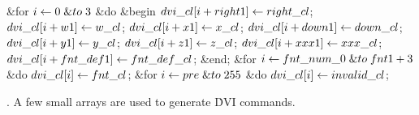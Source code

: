 \&{for} $\hbox{$i$}\gets0\mathrel{\&{to}}3$ \1\&{do}\6
\&{begin} $\\{dvi\_cl}[\hbox{$i$}+\\{right1}]\gets\\{right\_cl}$;\5
$\\{dvi\_cl}[\hbox{$i$}+\\{w1}]\gets\\{w\_cl}$;\5
$\\{dvi\_cl}[\hbox{$i$}+\\{x1}]\gets\\{x\_cl}$;\6
$\\{dvi\_cl}[\hbox{$i$}+\\{down1}]\gets\\{down\_cl}$;\5
$\\{dvi\_cl}[\hbox{$i$}+\\{y1}]\gets\\{y\_cl}$;\5
$\\{dvi\_cl}[\hbox{$i$}+\\{z1}]\gets\\{z\_cl}$;\6
$\\{dvi\_cl}[\hbox{$i$}+\\{xxx1}]\gets\\{xxx\_cl}$;\5
$\\{dvi\_cl}[\hbox{$i$}+\\{fnt\_def1}]\gets\\{fnt\_def\_cl}$;\6
\&{end};\2\6
\&{for} $\hbox{$i$}\gets\\{fnt\_num\_0}\mathrel{\&{to}}\\{fnt1}+3$ \1\&{do}\5
$\\{dvi\_cl}[\hbox{$i$}]\gets\\{fnt\_cl}$;\2\6
\&{for} $\hbox{$i$}\gets\\{pre}\mathrel{\&{to}}255$ \1\&{do}\5
$\\{dvi\_cl}[\hbox{$i$}]\gets\\{invalid\_cl}$;\2\par
\fi

. A few small arrays are used to generate \.{DVI} commands.

